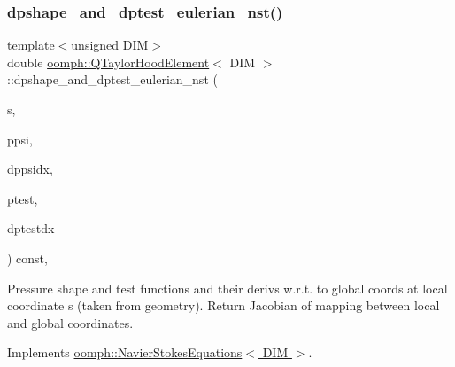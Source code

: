 \subsubsection{\texorpdfstring{dpshape\+\_\+and\+\_\+dptest\+\_\+eulerian\+\_\+nst()}{dpshape\_and\_dptest\_eulerian\_nst()}\hspace{0.1cm}{\footnotesize\ttfamily [1/3]}}
{\footnotesize\ttfamily template$<$unsigned D\+IM$>$ \\
double \hyperlink{classoomph_1_1QTaylorHoodElement}{oomph\+::\+Q\+Taylor\+Hood\+Element}$<$ D\+IM $>$\+::dpshape\+\_\+and\+\_\+dptest\+\_\+eulerian\+\_\+nst (\begin{DoxyParamCaption}\item[{const \hyperlink{classoomph_1_1Vector}{Vector}$<$ double $>$ \&}]{s,  }\item[{\hyperlink{classoomph_1_1Shape}{Shape} \&}]{ppsi,  }\item[{\hyperlink{classoomph_1_1DShape}{D\+Shape} \&}]{dppsidx,  }\item[{\hyperlink{classoomph_1_1Shape}{Shape} \&}]{ptest,  }\item[{\hyperlink{classoomph_1_1DShape}{D\+Shape} \&}]{dptestdx }\end{DoxyParamCaption}) const\hspace{0.3cm}{\ttfamily [inline]}, {\ttfamily [virtual]}}



Pressure shape and test functions and their derivs w.\+r.\+t. to global coords at local coordinate s (taken from geometry). Return Jacobian of mapping between local and global coordinates. 



Implements \hyperlink{classoomph_1_1NavierStokesEquations_a2f3024a4d370ec45ddffacb236bc2bb2}{oomph\+::\+Navier\+Stokes\+Equations$<$ D\+I\+M $>$}.

\mbox{\label{classoomph_1_1QTaylorHoodElement_a91faff3077dd80f893d58f93f5f1eb2e}} 
